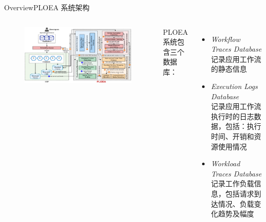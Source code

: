 \documentclass[aspectratio=169]{beamer}
\begin{document}
\begin{frame}{Overview}{PLOEA 系统架构}
  \begin{columns}
    \begin{figure}
      \centering
      \includegraphics[height=0.8\textheight]{img/method/PLOEA-system-left.pdf}
    \end{figure}

    PLOEA 系统包含三个数据库：
    \begin{itemize}
      \item \textit{Workflow Traces Database} \\
        记录应用工作流的静态信息
      \item \textit{Execution Logs Database} \\
        记录应用工作流执行时的日志数据，包括：执行时间、开销和资源使用情况
      \item \textit{Workload Traces Database} \\
        记录工作负载信息，包括请求到达情况、负载变化趋势及幅度
    \end{itemize}
  \end{columns}
\end{frame}
\end{document}
